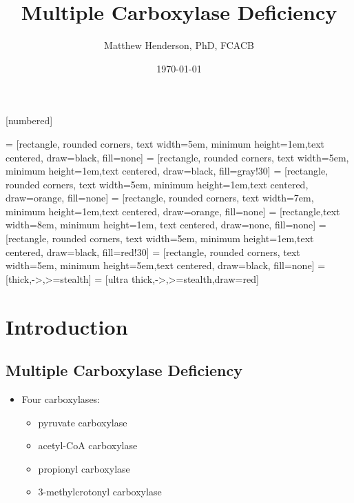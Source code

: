 \documentclass[presentation, smaller]{beamer}
\author{Matthew Henderson, PhD, FCACB}
\date{\today}
\title{Multiple Carboxylase Deficiency}
\begin{document}
\maketitle
\tableofcontents



\vspace{220pt}
\beamertemplatenavigationsymbolsempty
{}[numbered]


 = [rectangle, rounded corners, text width=5em, minimum height=1em,text centered, draw=black, fill=none]
 = [rectangle, rounded corners, text width=5em, minimum height=1em,text centered, draw=black, fill=gray!30]
 = [rectangle, rounded corners, text width=5em, minimum height=1em,text centered, draw=orange, fill=none]
 = [rectangle, rounded corners, text width=7em, minimum height=1em,text centered, draw=orange, fill=none]
 = [rectangle,text width=8em, minimum height=1em, text centered, draw=none, fill=none]
 = [rectangle, rounded corners, text width=5em, minimum height=1em,text centered, draw=black, fill=red!30]
 = [rectangle, rounded corners, text width=5em, minimum height=5em,text centered, draw=black, fill=none]
 = [thick,->,>=stealth]
 = [ultra thick,->,>=stealth,draw=red]

\section{Introduction}
\label{sec:orgheadline9}

\subsection{Multiple Carboxylase Deficiency}
\label{sec:orgheadline1}
\begin{itemize}
\item Four carboxylases:
\begin{itemize}
\item pyruvate carboxylase
\item acetyl-CoA carboxylase
\item propionyl carboxylase
\item 3-methylcrotonyl carboxylase
\end{itemize}
\end{itemize}
\end{document}
